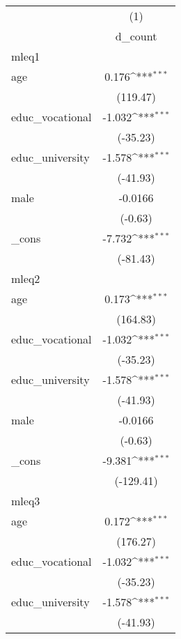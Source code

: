 {
\def\sym#1{\ifmmode^{#1}\else\(^{#1}\)\fi}
\begin{tabular}{l*{1}{c}}
\hline\hline
            &\multicolumn{1}{c}{(1)}\\
            &\multicolumn{1}{c}{d\_count}\\
\hline
mleq1       &                     \\
age         &       0.176\sym{***}\\
            &    (119.47)         \\
[1em]
educ\_vocational&      -1.032\sym{***}\\
            &    (-35.23)         \\
[1em]
educ\_university&      -1.578\sym{***}\\
            &    (-41.93)         \\
[1em]
male        &     -0.0166         \\
            &     (-0.63)         \\
[1em]
\_cons      &      -7.732\sym{***}\\
            &    (-81.43)         \\
\hline
mleq2       &                     \\
age         &       0.173\sym{***}\\
            &    (164.83)         \\
[1em]
educ\_vocational&      -1.032\sym{***}\\
            &    (-35.23)         \\
[1em]
educ\_university&      -1.578\sym{***}\\
            &    (-41.93)         \\
[1em]
male        &     -0.0166         \\
            &     (-0.63)         \\
[1em]
\_cons      &      -9.381\sym{***}\\
            &   (-129.41)         \\
\hline
mleq3       &                     \\
age         &       0.172\sym{***}\\
            &    (176.27)         \\
[1em]
educ\_vocational&      -1.032\sym{***}\\
            &    (-35.23)         \\
[1em]
educ\_university&      -1.578\sym{***}\\
            &    (-41.93)         \\

\end{tabular}}
